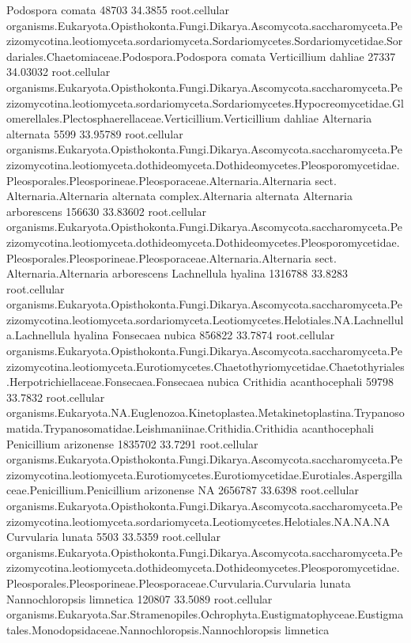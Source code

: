\documentclass{article}
\begin{document}
\begin{Schunk}
\begin{Soutput}
 Podospora comata 		 48703 34.3855 	 root.cellular organisms.Eukaryota.Opisthokonta.Fungi.Dikarya.Ascomycota.saccharomyceta.Pezizomycotina.leotiomyceta.sordariomyceta.Sordariomycetes.Sordariomycetidae.Sordariales.Chaetomiaceae.Podospora.Podospora comata
 Verticillium dahliae 		 27337 34.03032 	 root.cellular organisms.Eukaryota.Opisthokonta.Fungi.Dikarya.Ascomycota.saccharomyceta.Pezizomycotina.leotiomyceta.sordariomyceta.Sordariomycetes.Hypocreomycetidae.Glomerellales.Plectosphaerellaceae.Verticillium.Verticillium dahliae
 Alternaria alternata 		 5599 33.95789 	 root.cellular organisms.Eukaryota.Opisthokonta.Fungi.Dikarya.Ascomycota.saccharomyceta.Pezizomycotina.leotiomyceta.dothideomyceta.Dothideomycetes.Pleosporomycetidae.Pleosporales.Pleosporineae.Pleosporaceae.Alternaria.Alternaria sect. Alternaria.Alternaria alternata complex.Alternaria alternata
 Alternaria arborescens 		 156630 33.83602 	 root.cellular organisms.Eukaryota.Opisthokonta.Fungi.Dikarya.Ascomycota.saccharomyceta.Pezizomycotina.leotiomyceta.dothideomyceta.Dothideomycetes.Pleosporomycetidae.Pleosporales.Pleosporineae.Pleosporaceae.Alternaria.Alternaria sect. Alternaria.Alternaria arborescens
 Lachnellula hyalina 		 1316788 33.8283 	 root.cellular organisms.Eukaryota.Opisthokonta.Fungi.Dikarya.Ascomycota.saccharomyceta.Pezizomycotina.leotiomyceta.sordariomyceta.Leotiomycetes.Helotiales.NA.Lachnellula.Lachnellula hyalina
 Fonsecaea nubica 		 856822 33.7874 	 root.cellular organisms.Eukaryota.Opisthokonta.Fungi.Dikarya.Ascomycota.saccharomyceta.Pezizomycotina.leotiomyceta.Eurotiomycetes.Chaetothyriomycetidae.Chaetothyriales.Herpotrichiellaceae.Fonsecaea.Fonsecaea nubica
 Crithidia acanthocephali 		 59798 33.7832 	 root.cellular organisms.Eukaryota.NA.Euglenozoa.Kinetoplastea.Metakinetoplastina.Trypanosomatida.Trypanosomatidae.Leishmaniinae.Crithidia.Crithidia acanthocephali
 Penicillium arizonense 		 1835702 33.7291 	 root.cellular organisms.Eukaryota.Opisthokonta.Fungi.Dikarya.Ascomycota.saccharomyceta.Pezizomycotina.leotiomyceta.Eurotiomycetes.Eurotiomycetidae.Eurotiales.Aspergillaceae.Penicillium.Penicillium arizonense
 NA 		 2656787 33.6398 	 root.cellular organisms.Eukaryota.Opisthokonta.Fungi.Dikarya.Ascomycota.saccharomyceta.Pezizomycotina.leotiomyceta.sordariomyceta.Leotiomycetes.Helotiales.NA.NA.NA
 Curvularia lunata 		 5503 33.5359 	 root.cellular organisms.Eukaryota.Opisthokonta.Fungi.Dikarya.Ascomycota.saccharomyceta.Pezizomycotina.leotiomyceta.dothideomyceta.Dothideomycetes.Pleosporomycetidae.Pleosporales.Pleosporineae.Pleosporaceae.Curvularia.Curvularia lunata
 Nannochloropsis limnetica 		 120807 33.5089 	 root.cellular organisms.Eukaryota.Sar.Stramenopiles.Ochrophyta.Eustigmatophyceae.Eustigmatales.Monodopsidaceae.Nannochloropsis.Nannochloropsis limnetica

\end{Soutput}
\end{Schunk}
\end{document}
